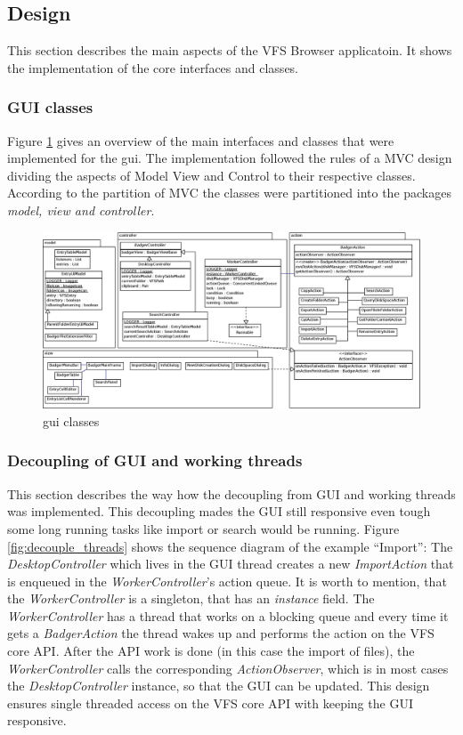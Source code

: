 \subsection{Design}
This section describes the main aspects of the VFS Browser applicatoin. It shows
the implementation of the core interfaces and classes.

\subsubsection{GUI classes}\label{sec:guiClasses}
Figure \ref{fig:gui_classes} gives an overview of the main interfaces and
classes that were implemented for the gui. The implementation followed the rules
of a MVC design dividing the aspects of Model View and Control to their
respective classes. According to the partition of MVC the classes were
partitioned into the packages \textit{model, view and controller}.

\begin{figure}[h!]
\centering
\includegraphics[width=1\textwidth]{figures/gui_classes.eps}
\caption{gui classes}
\label{fig:gui_classes}
\end{figure}


\subsubsection{Decoupling of GUI and working threads}
This section describes the way how the decoupling from GUI and working threads
was implemented. This decoupling mades the GUI still responsive even tough some
long running tasks like import or search would be running. Figure
\ref{fig:decouple_threads} shows the sequence diagram of the example ``Import'':
The \textit{DesktopController} which lives in the GUI thread creates a new
\textit{ImportAction} that is enqueued in the \textit{WorkerController}'s action queue. It is worth to mention, that the
\textit{WorkerController} is a singleton, that has an \textit{instance} field. The
\textit{WorkerController} has a thread that works on a blocking queue and every
time it gets a \textit{BadgerAction} the thread wakes up and performs the action
on the VFS core API. After the API work is done (in this case the import of
files), the \textit{WorkerController} calls the corresponding
\textit{ActionObserver}, which is in most cases the \textit{DesktopController}
instance, so that the GUI can be updated. This design ensures single threaded
access on the VFS core API with keeping the GUI responsive.

